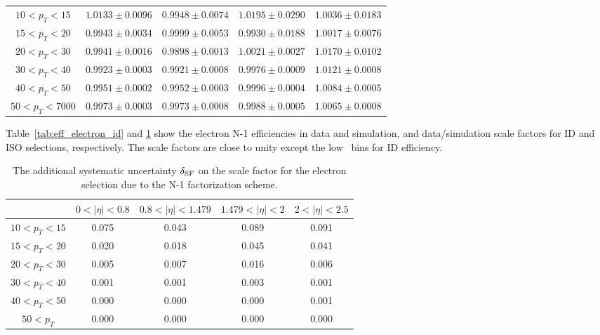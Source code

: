 \begin{table}[!htp]
\begin{center}
\begin{tabular}{c|c|c|c|c}
\hline
$ 10 < p_T <  15$ & $1.0133 \pm 0.0096$ & $0.9948 \pm 0.0074$ & $1.0195 \pm 0.0290$ & $1.0036 \pm 0.0183$  \\
$ 15 < p_T <  20$ & $0.9943 \pm 0.0034$ & $0.9999 \pm 0.0053$ & $0.9930 \pm 0.0188$ & $1.0017 \pm 0.0076$  \\
$ 20 < p_T <  30$ & $0.9941 \pm 0.0016$ & $0.9898 \pm 0.0013$ & $1.0021 \pm 0.0027$ & $1.0170 \pm 0.0102$  \\
$ 30 < p_T <  40$ & $0.9923 \pm 0.0003$ & $0.9921 \pm 0.0008$ & $0.9976 \pm 0.0009$ & $1.0121 \pm 0.0008$  \\
$ 40 < p_T <  50$ & $0.9951 \pm 0.0002$ & $0.9952 \pm 0.0003$ & $0.9996 \pm 0.0004$ & $1.0084 \pm 0.0005$  \\
$ 50 < p_T < 7000$ & $0.9973 \pm 0.0003$ & $0.9973 \pm 0.0008$ & $0.9988 \pm 0.0005$ & $1.0065 \pm 0.0008$  \\
\hline
\end{tabular}
\label{tab:eff_electron_iso}
\end{center}
\end{table}

Table~\ref{tab:eff_electron_id} and \ref{tab:eff_electron_iso} show 
the electron N-1 efficiencies in data and simulation, and data/simulation scale factors 
for ID and ISO selections, respectively. 
The scale factors are close to unity except the low \pt~bins for ID efficiency. 

%
\begin{table}[!htp]
\begin{center}
\small
\vspace{0.5cm} 
\caption{The additional systematic uncertainty $\delta_{\rm{SF}}$ on the  
scale factor for the electron selection due to the N-1 factorization scheme.}
\vspace{0.5cm} 
\begin{tabular}{c|c|c|c|c}
\hline & $0 < |\eta| < 0.8$ & $0.8 < |\eta| < 1.479$ & $1.479 < |\eta| < 2$ & $2 < |\eta| < 2.5$  \\
\hline
$ 10 < p_T <  15$ &    0.075  &     0.043  &     0.089  &     0.091  \\
$ 15 < p_T <  20$ &    0.020  &     0.018  &     0.045  &     0.041  \\
$ 20 < p_T <  30$ &    0.005  &     0.007  &     0.016  &     0.006  \\
$ 30 < p_T <  40$ &    0.001  &     0.001  &     0.003  &     0.001  \\
$ 40 < p_T <  50$ &    0.000  &     0.000  &     0.000  &     0.001  \\
$ 50 < p_T $ &   0.000  &     0.000  &     0.000  &     0.000  \\
\hline
\end{tabular}
\label{tab:eff_electron_nmsyst}
\end{center}
\end{table}

